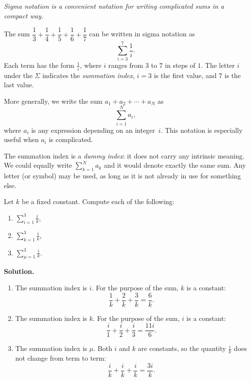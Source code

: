 \textit{Sigma notation is a convenient notation for writing complicated sums in a compact way.}

\begin{example}
\label{ex:7-1}
The sum $\dfrac{1}{3}+\dfrac{1}{4}+\dfrac{1}{5}+\dfrac{1}{6}+\dfrac{1}{7}$ can be written in sigma notation as
\[
  \sum_{i=3}^{7}\frac{1}{i}.
\]
Each term has the form $\frac{1}{i}$, where $i$ ranges from $3$ to $7$ in steps of $1$.  The letter $i$ under the $\Sigma$ indicates the \emph{summation index}, $i=3$ is the first value, and $7$ is the last value.
\end{example}

More generally, we write the sum $a_1 + a_2 + \cdots + a_N$ as
\[
  \sum_{i=1}^{N} a_i,
\]
where $a_i$ is any expression depending on an integer~$i$.  This notation is especially useful when $a_i$ is complicated.

\begin{remark}
The summation index is a \emph{dummy index}: it does not carry any intrinsic meaning.  We could equally write $\displaystyle\sum_{k=1}^{N} a_k$ and it would denote exactly the same sum.  Any letter (or symbol) may be used, as long as it is not already in use for something else.
\end{remark}

\begin{example}
\label{ex:7-2}
Let $k$ be a fixed constant.  Compute each of the following:
\begin{enumerate}[label=(\roman*)]
  \item $\displaystyle\sum_{i=1}^{3}\frac{i}{k}$,\qquad
  \item $\displaystyle\sum_{k=1}^{3}\frac{i}{k}$,\qquad
  \item $\displaystyle\sum_{\mu=1}^{3}\frac{i}{k}$.
\end{enumerate}

\textbf{Solution.}
\begin{enumerate}[label=(\roman*)]
  \item The summation index is $i$.  For the purpose of the sum, $k$ is a constant:
  \[
    \frac{1}{k}+\frac{2}{k}+\frac{3}{k} = \frac{6}{k}.
  \]
  \item The summation index is $k$.  For the purpose of the sum, $i$ is a constant:
  \[
    \frac{i}{1}+\frac{i}{2}+\frac{i}{3} = \frac{11i}{6}.
  \]
  \item The summation index is $\mu$.  Both $i$ and $k$ are constants, so the quantity $\frac{i}{k}$ does not change from term to term:
  \[
    \frac{i}{k}+\frac{i}{k}+\frac{i}{k} = \frac{3i}{k}.
  \]
\end{enumerate}
\end{example}

